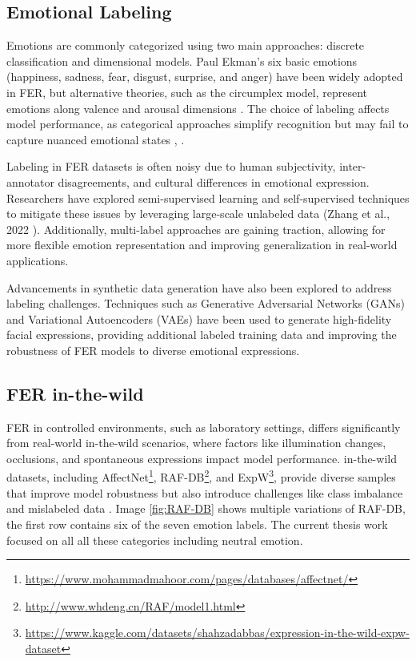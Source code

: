 \subsection{Emotional Labeling}

Emotions are commonly categorized using two main approaches: discrete classification and dimensional models. Paul Ekman’s six basic emotions (happiness, sadness, fear, disgust, surprise, and anger) have been widely adopted in FER, but alternative theories, such as the circumplex model, represent emotions along valence and arousal dimensions \cite{russell_circumplex_1980}. The choice of labeling affects model performance, as categorical approaches simplify recognition but may fail to capture nuanced emotional states \cite{mollahosseini_affectnet_2019}, \cite{kollias_affect_2021}. 

Labeling in FER datasets is often noisy due to human subjectivity, inter-annotator disagreements, and cultural differences in emotional expression. Researchers have explored semi-supervised learning and self-supervised techniques to mitigate these issues by leveraging large-scale unlabeled data (Zhang et al., 2022 \cite{zhang_transformer-based_2022}). Additionally, multi-label approaches are gaining traction, allowing for more flexible emotion representation and improving generalization in real-world applications. 

Advancements in synthetic data generation have also been explored to address labeling challenges. Techniques such as Generative Adversarial Networks (GANs) and Variational Autoencoders (VAEs) have been used to generate high-fidelity facial expressions, providing additional labeled training data and improving the robustness of FER models to diverse emotional expressions. 

\subsection{FER \gls{in-the-wild}}

\gls{FER} in controlled environments, such as laboratory settings, differs significantly from real-world \gls{in-the-wild} scenarios, where factors like illumination changes, occlusions, and spontaneous expressions impact model performance. \gls{in-the-wild} datasets, including AffectNet\footnote{\url{https://www.mohammadmahoor.com/pages/databases/affectnet/}}, RAF-DB\footnote{\url{http://www.whdeng.cn/RAF/model1.html}}, and ExpW\footnote{\url{https://www.kaggle.com/datasets/shahzadabbas/expression-in-the-wild-expw-dataset}}, provide diverse samples that improve model robustness but also introduce challenges like class imbalance and mislabeled data \cite{zhang_leave_2023}. Image \ref{fig:RAF-DB} shows multiple variations of RAF-DB, the first row contains six of the seven emotion labels. The current thesis work focused on all all these categories including neutral emotion. 


